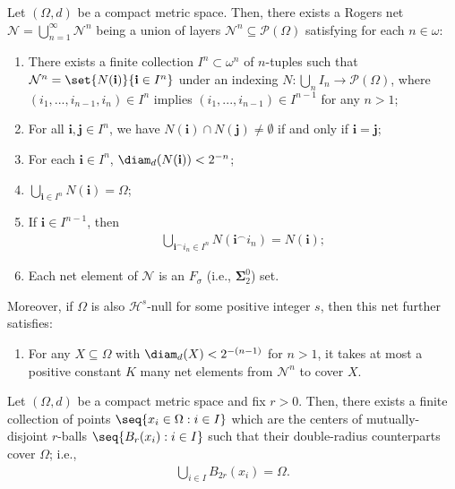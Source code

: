 \begin{theorem}
    \label{thm:Larman_net_on_finite_dimensional_compact_metric}
    Let $(\Omega, d)$ be a compact metric space. Then, there exists a Rogers net $\mathcal{N} = \bigcup_{n = 1}^\infty \mathcal{N}^n$ being a union of layers $\mathcal{N}^n \subseteq \mathcal{P}(\Omega)$ satisfying for each $n \in \omega$:
    \begin{enumerate}[label=(\roman*)]
        \item There exists a finite collection $I^n \subset \omega^n$ of $n$-tuples such that $\mathcal{N}^n = \set{N(\mathbf{i})}{\mathbf{i} \in I^n}$ under an indexing $N: \bigcup_n I_n \to \mathcal{P}(\Omega)$, where $(i_1, ..., i_{n - 1}, i_n) \in I^n$ implies $(i_1, ..., i_{n - 1}) \in I^{n - 1}$ for any $n > 1$;
        \item For all $\mathbf{i}, \mathbf{j} \in I^n$, we have $N(\mathbf{i}) \cap N(\mathbf{j}) \neq \emptyset$ if and only if $\mathbf{i} = \mathbf{j}$;
        \item For each $\mathbf{i} \in I^n$, $\diam_d(N(\mathbf{i})) < 2^{-n}$;
        \item $\bigcup_{\mathbf{i} \in I^n} N(\mathbf{i}) = \Omega$;
        \item If $\mathbf{i} \in I^{n - 1}$, then
        \begin{align*}
            \bigcup_{\mathbf{i}^\frown i_n \in I^n} N(\mathbf{i} ^\frown i_n) = N(\mathbf{i});
        \end{align*}
        \item Each net element of $\mathcal{N}$ is an $F_\sigma$ (i.e., $\mathbf{\Sigma}^0_2$) set.
        \end{enumerate}
    Moreover, if $\Omega$ is also $\mathcal{H}^s$-null for some positive integer $s$, then this net further satisfies:
    \begin{enumerate}
        \item[(vii)] For any $X \subseteq \Omega$ with $\diam_d(X) < 2^{-(n - 1)}$ for $n > 1$, it takes at most a positive constant $K$ many net elements from $\mathcal{N}^n$ to cover $X$.        
    \end{enumerate}
\end{theorem}
\begin{lemma}
    \label{lemma:Larman_compact_metric_space}
    Let $(\Omega, d)$ be a compact metric space and fix $r > 0$. Then, there exists a finite collection of points $\seq{x_i \in \Omega: i \in I}$ which are the centers of mutually-disjoint $r$-balls $\seq{B_r(x_i) : i \in I}$ such that their double-radius counterparts cover $\Omega$; i.e., 
    \begin{align*}
        \bigcup_{i \in I} B_{2r}(x_i) = \Omega.
    \end{align*}
\end{lemma}

